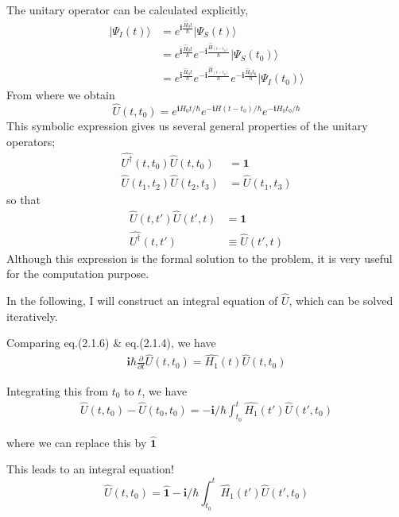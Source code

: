 ﻿\documentclass[twoside]{book}
\numberwithin{equation}{section}
\begin{document}
 The unitary operator can be calculated explicitly,
\begin{align}
|\Psi_I(t)\rangle& =e^{\bm{i}  \frac{\hat H_0t}{\hbar}}|\Psi_S(t)\rangle \nonumber \\
&= e^{\bm{i}  \frac{\hat H_0t}{\hbar}}e^{-\bm{i}  \frac{\hat H_(t-t_0)}{\hbar}}|\Psi_S(t_0)\rangle \nonumber \\& = e^{\bm{i}  \frac{\hat H_0t}{\hbar}}e^{-\bm{i}  \frac{\hat H_(t-t_0)}{\hbar}}e^{-\bm{i}  \frac{\hat H_0t_0}{\hbar}}|\Psi_I(t_0)\rangle \nonumber
\end{align}
From where we obtain
\begin{equation} \tag{2.1.6'}
\hat{U}(t,t_0)=e^{\bm{i}H_0t/\hbar}e^{-\bm{i}H(t-t_0)/\hbar}e^{-\bm{i}H_0t_0/\hbar} \nonumber
\end{equation}
 This symbolic expression gives us several general properties of the unitary operators;
\begin{align}
\hat{U^{\dagger}}(t,t_0)\hat{U}(t,t_0)&=\bm{1} \nonumber\\
\hat{U}(t_1,t_2)\hat{U}(t_2,t_3)&=\hat{U}(t_1,t_3)\nonumber
\end{align}
so that 
\begin{align}
\hat{U}(t,t')\hat{U}(t',t)&=\bm{1} \nonumber \\
\hat{U^{\dagger}}(t,t') & \equiv \hat{U}(t',t) \nonumber
\end{align}
 Although this expression is the formal solution to the problem, it is very useful for the computation purpose.

 In the following, I will construct an integral equation of $\hat{U}$, which can be solved iteratively.

 Comparing eq.(2.1.6) \& eq.(2.1.4), we have
\begin{align}\tag{2.1.6''}
\bm{i}\hbar \frac{\partial}{\partial t} \hat{U}(t,t_0)=\hat{H_1}(t)\hat{U}(t,t_0) \nonumber
\end{align}

 Integrating this from $t_0$ to $t$, we have 
\begin{align}
\hat{U}(t,t_0)-\hat{U}(t_0,t_0)=-\bm{i}/\hbar \int_{t_0}^{t} \hat{H_1}(t')\hat{U}(t',t_0) \nonumber
\end{align}

 where we can replace this by $\hat{\bm{1}}$

 This leads to an integral equation!
\begin{equation}
\hat{U}(t,t_0)=\hat{\bm{1}}-\bm{i}/\hbar \int_{t_0}^{t} \hat{H_1}(t')\hat{U}(t',t_0) \nonumber
\end{equation}
\end{document}
